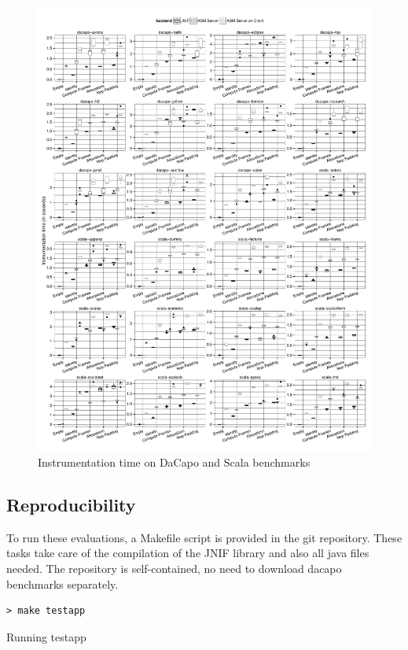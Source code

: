 \begin{figure}[t]
\includegraphics[width=\textwidth]{chapters/jnif/eval-all-chart-instr}
\caption{Instrumentation time on DaCapo and Scala benchmarks}
\label{fig:instr-time}
\end{figure}

\subsection*{Reproducibility}

To run these evaluations, a Makefile script is provided in the git repository.
These tasks take care of the compilation of the JNIF library and also all java files needed. 
The repository is self-contained, no need to download dacapo benchmarks separately.

\begin{listing}
\begin{verbatim}
> make testapp
\end{verbatim}
\caption{Running testapp}
\label{usage-parse2}
\end{listing}

